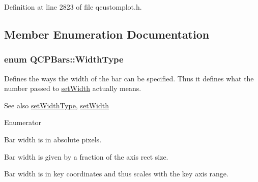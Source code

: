 Definition at line 2823 of file qcustomplot.\+h.



\subsection{Member Enumeration Documentation}
\hypertarget{class_q_c_p_bars_a65dbbf1ab41cbe993d71521096ed4649}{}
\subsubsection[{Width\+Type}]{\setlength{\rightskip}{0pt plus 5cm}enum {\bf Q\+C\+P\+Bars\+::\+Width\+Type}}\label{class_q_c_p_bars_a65dbbf1ab41cbe993d71521096ed4649}
Defines the ways the width of the bar can be specified. Thus it defines what the number passed to \hyperlink{class_q_c_p_bars_afec6116579d44d5b706e0fa5e5332507}{set\+Width} actually means.

\begin{DoxySeeAlso}{See also}
\hyperlink{class_q_c_p_bars_adcaa3b41281bb2c0f7949b341592fcc0}{set\+Width\+Type}, \hyperlink{class_q_c_p_bars_afec6116579d44d5b706e0fa5e5332507}{set\+Width} 
\end{DoxySeeAlso}
\begin{Desc}
\item[Enumerator]\par
\begin{description}
\item[{\em 
\hypertarget{class_q_c_p_bars_a65dbbf1ab41cbe993d71521096ed4649ab74315c9aa77df593c58dd25dfc0de35}{}wt\+Absolute\label{class_q_c_p_bars_a65dbbf1ab41cbe993d71521096ed4649ab74315c9aa77df593c58dd25dfc0de35}
}]Bar width is in absolute pixels. \item[{\em 
\hypertarget{class_q_c_p_bars_a65dbbf1ab41cbe993d71521096ed4649a90bc09899361ad3422ff277f7c790ffe}{}wt\+Axis\+Rect\+Ratio\label{class_q_c_p_bars_a65dbbf1ab41cbe993d71521096ed4649a90bc09899361ad3422ff277f7c790ffe}
}]Bar width is given by a fraction of the axis rect size. \item[{\em 
\hypertarget{class_q_c_p_bars_a65dbbf1ab41cbe993d71521096ed4649aad3cc60ae1bfb1160a30237bee9eaf10}{}wt\+Plot\+Coords\label{class_q_c_p_bars_a65dbbf1ab41cbe993d71521096ed4649aad3cc60ae1bfb1160a30237bee9eaf10}
}]Bar width is in key coordinates and thus scales with the key axis range. \end{description}
\end{Desc}


